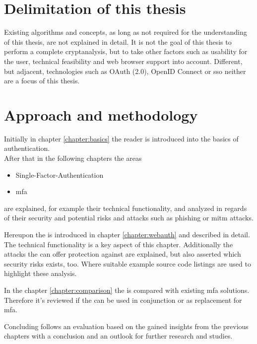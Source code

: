 \section{Delimitation of this thesis}

Existing algorithms and concepts, as long as not required for the understanding of this thesis, are not explained in detail. It is not the goal of this thesis to perform a complete cryptanalysis, but to take other factors such as usability for the user, technical feasibility and web browser support into account. Different, but adjacent, technologies such as OAuth (2.0), OpenID Connect or \gls{sso} neither are a focus of this thesis.

\section{Approach and methodology}

Initially in chapter \ref{chapter:basics} the reader is introduced into the basics of authentication.\\
After that in the following chapters the areas

\begin{itemize}
	\item Single-Factor-Authentication
	\item \gls{mfa}
\end{itemize}

are explained, for example their technical functionality, and analyzed in regards of their security and potential risks and attacks such as phishing or \gls{mitm} attacks.

Hereupon the \wa{} is introduced in chapter \ref{chapter:webauth} and described in detail. The technical functionality is a key aspect of this chapter. Additionally the attacks the \wa{} can offer protection against are explained, but also asserted which security risks exists, too. Where suitable example source code listings are used to highlight these analysis.

In the chapter \ref{chapter:comparison} the \wa{} is compared with existing \gls{mfa} solutions. Therefore it's reviewed if the \wa{} can be used in conjunction or as replacement for \gls{mfa}.

Concluding follows an evaluation based on the gained insights from the previous chapters with a conclusion and an outlook for further research and studies.
